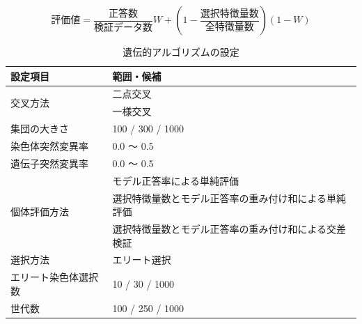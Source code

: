 \begin{equation}
    評価値 = \frac{正答数}{検証データ数} W + (1 - \frac{選択特徴量数}{全特徴量数}) (1 - W)
\end{equation}

\begin{table}[t]
    \caption{遺伝的アルゴリズムの設定}
    \centering
    \begin{tabular}{ll}
        \hline
        設定項目 & 範囲・候補 \\ \hline\hline
        \multirow{2}{*}{交叉方法} & 二点交叉 \\
        & 一様交叉 \\ \hline
        集団の大きさ & 100 / 300 / 1000 \\ \hline
        染色体突然変異率 & 0.0 〜 0.5 \\ \hline
        遺伝子突然変異率 & 0.0 〜 0.5 \\ \hline
        \multirow{3}{*}{個体評価方法} & モデル正答率による単純評価 \\
        & 選択特徴量数とモデル正答率の重み付け和による単純評価 \\
        & 選択特徴量数とモデル正答率の重み付け和による交差検証 \\ \hline
        選択方法 & エリート選択 \\ \hline
        エリート染色体選択数 & 10 / 30 / 1000 \\ \hline
        世代数 & 100 / 250 / 1000 \\ \hline
    \end{tabular}
    \label{tab:ga_setting}
\end{table}
